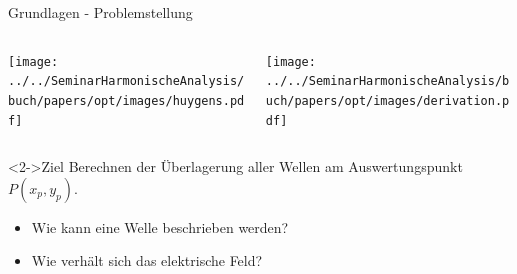 \begin{frame}[plain]
\end{frame}

\begin{frame}{Grundlagen - Problemstellung}
    \begin{columns}
        \begin{column}{0.3\textwidth}
            \texttt{[image: ../../SeminarHarmonischeAnalysis/buch/papers/opt/images/huygens.pdf]}
        \end{column}
        \begin{column}{0.7\textwidth}
            \texttt{[image: ../../SeminarHarmonischeAnalysis/buch/papers/opt/images/derivation.pdf]}
        \end{column}
    \end{columns}

    \begin{block}<2->{Ziel}
        Berechnen der Überlagerung aller Wellen am Auswertungspunkt $P(x_p, y_p)$.

        \begin{itemize}
            \item<3-> Wie kann eine Welle beschrieben werden?
            \item<4-> Wie verhält sich das elektrische Feld?
        \end{itemize}
    \end{block}
\end{frame}

